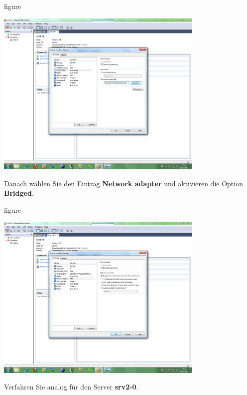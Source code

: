 \begin{nofloat}{figure}
\begin{center}
\includegraphics[width=0.75\textwidth]{screenshots/vm09.png}
\end{center}
\end{nofloat}

Danach wählen Sie den Eintrag \textbf{Network adapter} und aktivieren die Option
\textbf{Bridged}.

\begin{nofloat}{figure}
\begin{center}
\includegraphics[width=0.75\textwidth]{screenshots/vm10.png}
\end{center}
\end{nofloat}

Verfahren Sie analog für den Server \textbf{srv2-0}.

